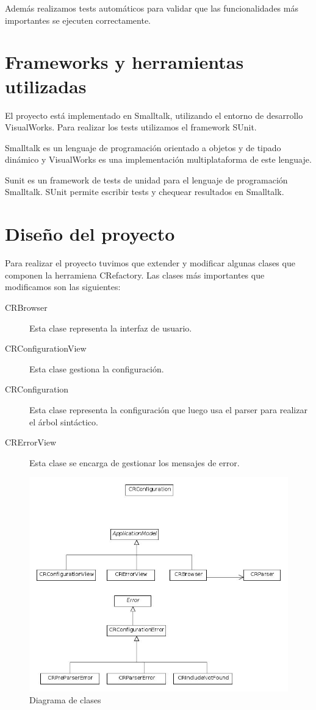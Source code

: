 \documentclass[a4paper,oneside,12pt]{article}
\begin{document}
Adem\'as realizamos tests autom\'aticos para validar que las funcionalidades m\'as importantes se ejecuten correctamente.

\section{Frameworks y herramientas utilizadas}
El proyecto est\'a implementado en Smalltalk, utilizando el entorno de desarrollo VisualWorks. Para realizar los tests utilizamos el framework SUnit.

Smalltalk es un lenguaje de programaci\'on orientado a objetos y de tipado din\'amico y VisualWorks es una implementaci\'on multiplataforma de este lenguaje.

Sunit es un framework de tests de unidad para el lenguaje de programaci\'on Smalltalk. SUnit permite escribir tests y chequear resultados en Smalltalk.

\section{Diseño del proyecto}
Para realizar el proyecto tuvimos que extender y modificar algunas clases que componen la herramiena CRefactory. Las clases m\'as importantes que modificamos son las siguientes:
\begin{description}
\item[CRBrowser] Esta clase representa la interfaz de usuario.
\item[CRConfigurationView] Esta clase gestiona la configuraci\'on.
\item[CRConfiguration] Esta clase representa la configuraci\'on que luego usa el parser para realizar el \'arbol sint\'actico.
\item[CRErrorView] Esta clase se encarga de gestionar los mensajes de error.
\end{description}

\begin{figure}[h!]
  \centering
    \includegraphics[scale=0.6]{images/diagrama_de_clases.jpg}
    \caption{Diagrama de clases}
    \label{diagrama_de_clases}
\end{figure}
\end{document}
